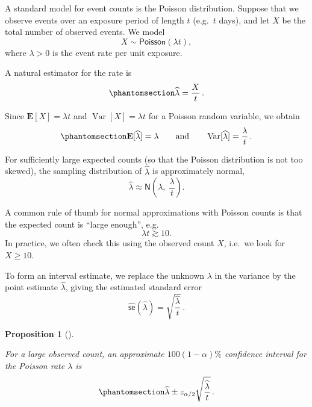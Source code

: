\documentclass[
  a4paper,
  DIV=11,
  numbers=noendperiod,
  oneside]{scrreprt}
\theoremstyle{plain}
\theoremstyle{definition}
\theoremstyle{definition}
\theoremstyle{definition}
\theoremstyle{plain}
\newtheorem{proposition}{Proposition}[chapter]
\theoremstyle{remark}
\begin{document}
A standard model for event counts is the Poisson distribution. Suppose
that we observe events over an exposure period of length \(t\)
(e.g.~\(t\) days), and let \(X\) be the total number of observed events.
We model \[
X \sim \mathsf{Poisson}(\lambda t),
\] where \(\lambda > 0\) is the event rate per unit exposure.

A natural estimator for the rate is
\begin{equation}\phantomsection\label{eq-rate-estimator}{
\widehat{\lambda} = \frac{X}{t}\,.
}\end{equation}

Since \(\mathbf{E}[X] = \lambda t\) and
\(\mathop{\mathrm{Var}}[X] = \lambda t\) for a Poisson random variable,
we obtain \begin{equation}\phantomsection\label{eq-rate-mean-var}{
\mathbf{E}[\widehat{\lambda}] = \lambda
\qquad \text{and} \qquad
\mathop{\mathrm{Var}}[\widehat{\lambda}] = \frac{\lambda}{t}\,.
}\end{equation}

For sufficiently large expected counts (so that the Poisson distribution
is not too skewed), the sampling distribution of \(\widehat{\lambda}\)
is approximately normal, \[
\widehat{\lambda} \approx \mathsf{N}\!\left(\lambda,\; \frac{\lambda}{t}\right).
\]

\begin{tcolorbox}[enhanced jigsaw, toprule=.15mm, colbacktitle=quarto-callout-tip-color!10!white, breakable, toptitle=1mm, title=\textcolor{quarto-callout-tip-color}{\faLightbulb}\hspace{0.5em}{Rule of thumb}, left=2mm, leftrule=.75mm, colback=white, colframe=quarto-callout-tip-color-frame, coltitle=black, opacitybacktitle=0.6, rightrule=.15mm, titlerule=0mm, bottomrule=.15mm, bottomtitle=1mm, arc=.35mm, opacityback=0]

A common rule of thumb for normal approximations with Poisson counts is
that the expected count is ``large enough'', e.g. \[
\lambda t \gtrsim 10.
\] In practice, we often check this using the observed count \(X\),
i.e.~we look for \(X \geq 10\).

\end{tcolorbox}

To form an interval estimate, we replace the unknown \(\lambda\) in the
variance by the point estimate \(\widehat{\lambda}\), giving the
estimated standard error \[
\widehat{\mathsf{se}}(\widehat{\lambda})
= \sqrt{\frac{\widehat{\lambda}}{t}}\,.
\]

\begin{proposition}[]\protect\hypertarget{prp-ci-rate}{}\label{prp-ci-rate}

For a large observed count, an approximate \(100(1-\alpha)\%\)
confidence interval for the Poisson rate \(\lambda\) is
\begin{equation}\phantomsection\label{eq-ci-rate}{
\widehat{\lambda} \pm z_{\alpha/2}\sqrt{\frac{\widehat{\lambda}}{t}}\,.
}\end{equation}

\end{proposition}
\end{document}
